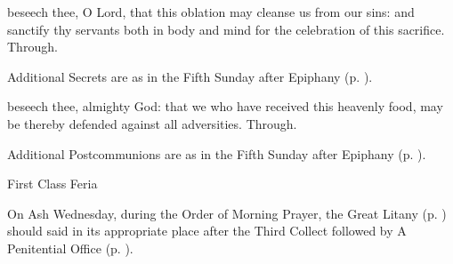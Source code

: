 \secret
{} beseech thee, O Lord, that this oblation may cleanse us from our sins: and sanctify thy servants both in body and mind for the celebration of this sacrifice. Through.
\begin{rubric}
    Additional Secrets are as in the Fifth Sunday after Epiphany (p. \pageref{EpiphanyVSecret}).
\end{rubric}
\postcommunion
{} beseech thee, almighty God: that we who have received this heavenly food, may be thereby defended against all adversities. Through.
\begin{rubric}
    Additional Postcommunions are as in the Fifth Sunday after Epiphany (p. \pageref{EpiphanyVPostcommunion}).
\end{rubric}

\begin{inhead}
{First Class Feria}
\end{inhead}
\par\noindent
\begin{rubric}
    On Ash Wednesday, during the Order of Morning Prayer, the Great Litany (p. \pageref{litany}) should said in its appropriate place after the Third Collect followed by A Penitential Office (p. \pageref{penitential}).
\end{rubric}

